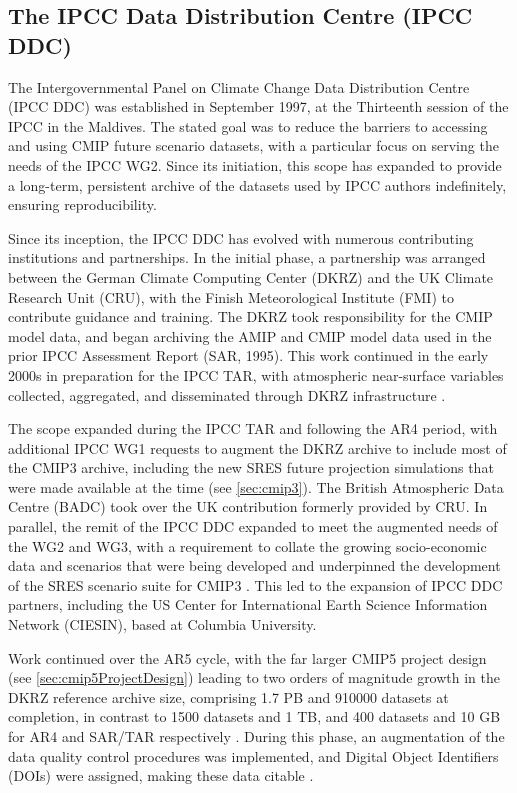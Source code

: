 \documentclass[manuscript]{copernicus}
\def\cred#1{{\color{red}#1}}
\begin{document}
\subsection{The IPCC Data Distribution Centre (IPCC DDC)}
\label{sec:IPCC-DDC}

The Intergovernmental Panel on Climate Change Data Distribution Centre (IPCC DDC) was established in September 1997, at the Thirteenth session of the IPCC in the Maldives. The stated goal was to reduce the barriers to accessing and using CMIP future scenario datasets, with a particular focus on serving the needs of the IPCC WG2. Since its initiation, this scope has expanded to provide a long-term, persistent archive of the datasets used by IPCC authors indefinitely, ensuring reproducibility.

Since its inception, the IPCC DDC has evolved with numerous contributing institutions and partnerships. In the initial phase, a partnership was arranged between the German Climate Computing Center (DKRZ) and the UK Climate Research Unit (CRU), with the Finish Meteorological Institute (FMI) to contribute guidance and training. The DKRZ took responsibility for the CMIP model data, and began archiving the AMIP and CMIP model data used in the prior IPCC Assessment Report (SAR, 1995). This work continued in the early 2000s in preparation for the IPCC TAR, with atmospheric near-surface variables collected, aggregated, and disseminated through DKRZ infrastructure \citep{stockhause_twenty-five_2022}.

The scope expanded during the IPCC TAR and following the AR4 period, with additional IPCC WG1 requests to augment the DKRZ archive to include most of the CMIP3 archive, including the new SRES future projection simulations that were made available at the time (see \autoref{sec:cmip3}). The British Atmospheric Data Centre (BADC) took over the UK contribution formerly provided by CRU. In parallel, the remit of the IPCC DDC expanded to meet the augmented needs of the WG2 and WG3, with a requirement to collate the growing socio-economic data and scenarios that were being developed and underpinned the development of the SRES scenario suite for CMIP3 \citep{nakicenovic_summary_2000}. This led to the expansion of IPCC DDC partners, including the US Center for International Earth Science Information Network (CIESIN), based at Columbia University. 

Work continued over the AR5 cycle, with the far larger CMIP5 project design (see \autoref{sec:cmip5ProjectDesign}) leading to two orders of magnitude growth in the DKRZ reference archive size, comprising 1.7 PB and 910000 datasets at completion, in contrast to 1500 datasets and 1 TB, and 400 datasets and 10 GB for AR4 and SAR/TAR respectively \citep{stockhause_twenty-five_2022}. During this phase, an augmentation of the data quality control procedures was implemented, and Digital Object Identifiers (DOIs) were assigned, making these data citable \citep{stockhause_quality_2012}.
\end{document}
